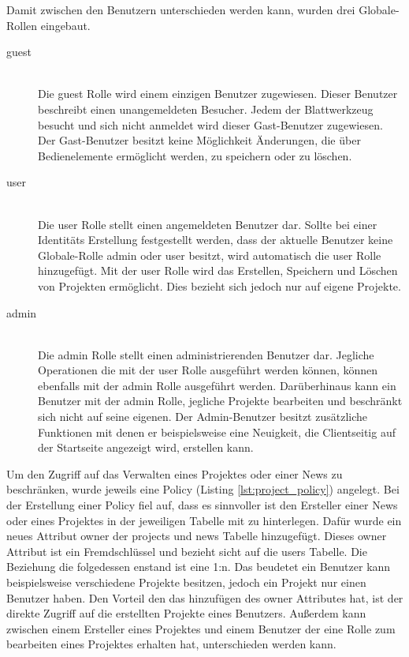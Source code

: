 Damit zwischen den Benutzern unterschieden werden kann, wurden drei Globale-Rollen eingebaut.

\begin{description}
	\item[guest]\hfill\\
	Die guest Rolle wird einem einzigen Benutzer zugewiesen. Dieser Benutzer beschreibt einen unangemeldeten Besucher. Jedem der Blattwerkzeug besucht und sich nicht anmeldet wird dieser Gast-Benutzer zugewiesen. Der Gast-Benutzer besitzt keine Möglichkeit Änderungen, die über Bedienelemente ermöglicht werden, zu speichern oder zu löschen.
	\item[user]\hfill\\
	Die user Rolle stellt einen angemeldeten Benutzer dar. Sollte bei einer Identitäts Erstellung festgestellt werden, dass der aktuelle Benutzer keine Globale-Rolle admin oder user besitzt, wird automatisch die user Rolle hinzugefügt. Mit der user Rolle wird das Erstellen, Speichern und Löschen von Projekten ermöglicht. Dies bezieht sich jedoch nur auf eigene Projekte.
	\item[admin]\hfill\\
	Die admin Rolle stellt einen administrierenden Benutzer dar. Jegliche Operationen die mit der user Rolle ausgeführt werden können, können ebenfalls mit der admin Rolle ausgeführt werden. Darüberhinaus kann ein Benutzer mit der admin Rolle, jegliche Projekte bearbeiten und beschränkt sich nicht auf seine eigenen. Der Admin-Benutzer besitzt zusätzliche Funktionen mit denen er beispielsweise eine Neuigkeit, die Clientseitig auf der Startseite angezeigt wird, erstellen kann.
\end{description}

Um den Zugriff auf das Verwalten eines Projektes oder einer News zu beschränken, wurde jeweils eine Policy (Listing \ref{lst:project_policy}) angelegt. Bei der Erstellung einer Policy fiel auf, dass es sinnvoller ist den Ersteller einer News oder eines Projektes in der jeweiligen Tabelle mit zu hinterlegen. Dafür wurde ein neues Attribut owner der projects und news Tabelle hinzugefügt. Dieses owner Attribut ist ein Fremdschlüssel und bezieht sicht auf die users Tabelle. Die Beziehung die folgedessen enstand ist eine 1:n. Das beudetet ein Benutzer kann beispielsweise verschiedene Projekte besitzen, jedoch ein Projekt nur einen Benutzer haben. Den Vorteil den das hinzufügen des owner Attributes hat, ist der direkte Zugriff auf die erstellten Projekte eines Benutzers. Außerdem kann zwischen einem Ersteller eines Projektes und einem Benutzer der eine Rolle zum bearbeiten eines Projektes erhalten hat, unterschieden werden kann.

